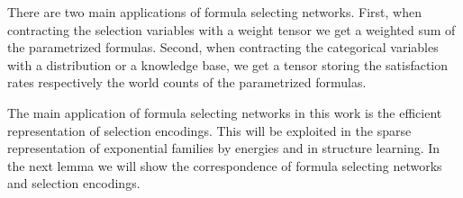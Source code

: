

%










There are two main applications of formula selecting networks.
First, when contracting the selection variables with a weight tensor we get a weighted sum of the parametrized formulas.
Second, when contracting the categorical variables with a distribution or a knowledge base, we get a tensor storing the satisfaction rates respectively the world counts of the parametrized formulas.


The main application of formula selecting networks in this work is the efficient representation of selection encodings.
This will be exploited in the sparse representation of exponential families by energies and in structure learning.
In the next lemma we will show the correspondence of formula selecting networks and selection encodings.

